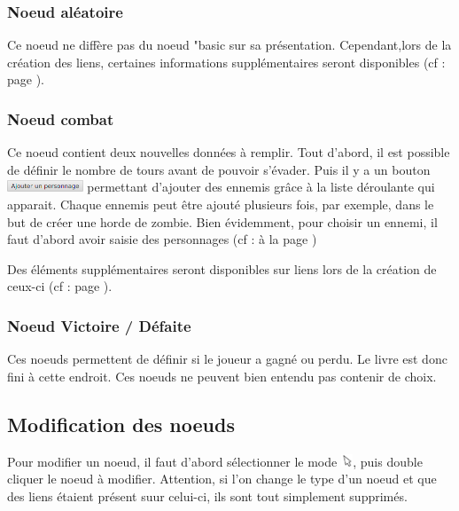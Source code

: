 			\subsubsection{Noeud aléatoire}

				Ce noeud ne diffère pas du noeud "basic sur sa présentation. Cependant,lors de la création des liens, certaines informations supplémentaires seront disponibles (cf :  page \pageref{subsubsec:lienAléatoire}).

			\subsubsection{Noeud combat}
				\label{subsubsec:combat}

				Ce noeud contient deux nouvelles données à remplir. Tout d'abord, il est possible de définir le nombre de tours avant de pouvoir s'évader. Puis il y a un bouton \includegraphics[height=10pt]{img/noeudAddPersonnage} permettant d'ajouter des ennemis grâce à la liste déroulante qui apparait. Chaque ennemis peut être ajouté plusieurs fois, par exemple, dans le but de créer une horde de zombie. Bien évidemment, pour choisir un ennemi, il faut d'abord avoir saisie des personnages (cf :  à la page \pageref{sec:perso})

				Des éléments supplémentaires seront disponibles sur liens lors de la création de ceux-ci (cf :  page \pageref{subsubsec:lienCombat}).

			\subsubsection{Noeud Victoire / Défaite}

				Ces noeuds permettent de définir si le joueur a gagné ou perdu. Le livre est donc fini à cette endroit. Ces noeuds ne peuvent bien entendu pas contenir de choix.

		\subsection{Modification des noeuds}

			Pour modifier un noeud, il faut d'abord sélectionner le mode \includegraphics[height=10pt, keepaspectratio]{img/icons/select.png}, puis double cliquer le noeud à modifier. Attention, si l'on change le type d'un noeud et que des liens étaient présent suur celui-ci, ils sont tout simplement supprimés.

